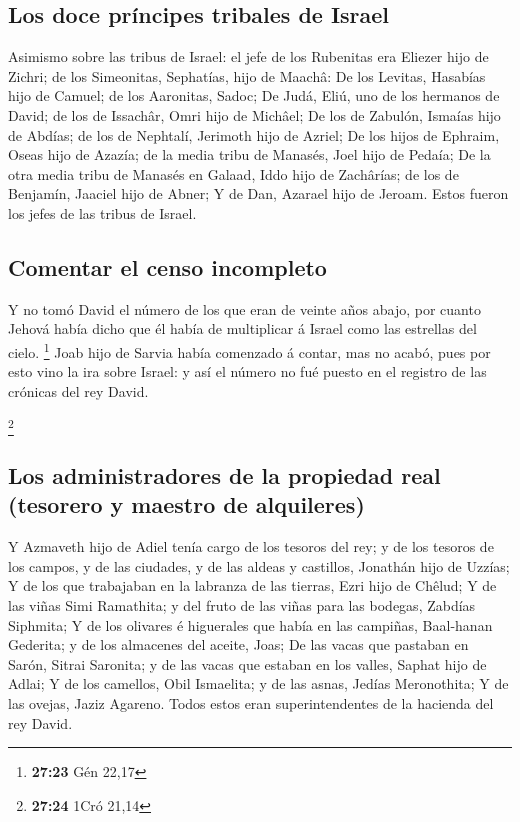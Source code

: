 \hypertarget{los-doce-pruxedncipes-tribales-de-israel}{%
\subsection{Los doce príncipes tribales de
Israel}\label{los-doce-pruxedncipes-tribales-de-israel}}

 Asimismo sobre las tribus de Israel: el jefe de los
Rubenitas era Eliezer hijo de Zichri; de los Simeonitas, Sephatías, hijo
de Maachâ:  De los Levitas, Hasabías hijo de Camuel; de los
Aaronitas, Sadoc;  De Judá, Eliú, uno de los hermanos de
David; de los de Issachâr, Omri hijo de Michâel;  De los de
Zabulón, Ismaías hijo de Abdías; de los de Nephtalí, Jerimoth hijo de
Azriel;  De los hijos de Ephraim, Oseas hijo de Azazía; de
la media tribu de Manasés, Joel hijo de Pedaía;  De la otra
media tribu de Manasés en Galaad, Iddo hijo de Zachârías; de los de
Benjamín, Jaaciel hijo de Abner;  Y de Dan, Azarael hijo de
Jeroam. Estos fueron los jefes de las tribus de Israel.

\hypertarget{comentar-el-censo-incompleto}{%
\subsection{Comentar el censo
incompleto}\label{comentar-el-censo-incompleto}}

 Y no tomó David el número de los que eran de veinte años
abajo, por cuanto Jehová había dicho que él había de multiplicar á
Israel como las estrellas del cielo. \footnote{\textbf{27:23} Gén 22,17}
 Joab hijo de Sarvia había comenzado á contar, mas no
acabó, pues por esto vino la ira sobre Israel: y así el número no fué
puesto en el registro de las crónicas del rey David.

\footnote{\textbf{27:24} 1Cró 21,14}

\hypertarget{los-administradores-de-la-propiedad-real-tesorero-y-maestro-de-alquileres}{%
\subsection{Los administradores de la propiedad real (tesorero y maestro
de
alquileres)}\label{los-administradores-de-la-propiedad-real-tesorero-y-maestro-de-alquileres}}

 Y Azmaveth hijo de Adiel tenía cargo de los tesoros del
rey; y de los tesoros de los campos, y de las ciudades, y de las aldeas
y castillos, Jonathán hijo de Uzzías;  Y de los que
trabajaban en la labranza de las tierras, Ezri hijo de Chêlud;
 Y de las viñas Simi Ramathita; y del fruto de las viñas
para las bodegas, Zabdías Siphmita;  Y de los olivares é
higuerales que había en las campiñas, Baal-hanan Gederita; y de los
almacenes del aceite, Joas;  De las vacas que pastaban en
Sarón, Sitrai Saronita; y de las vacas que estaban en los valles, Saphat
hijo de Adlai;  Y de los camellos, Obil Ismaelita; y de las
asnas, Jedías Meronothita;  Y de las ovejas, Jaziz Agareno.
Todos estos eran superintendentes de la hacienda del rey David.

